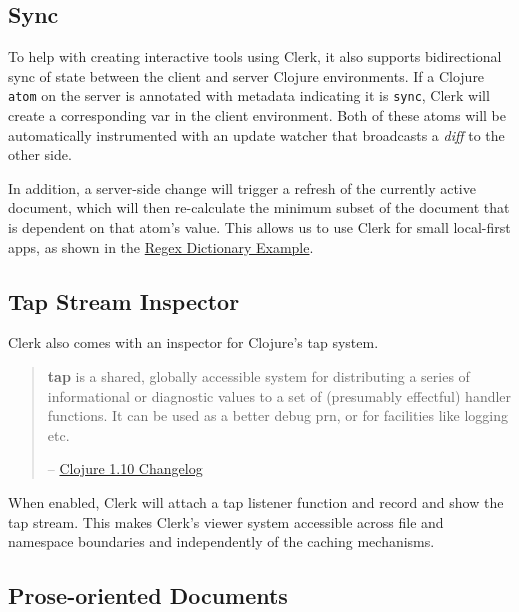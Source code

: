\documentclass[sigconf,screen]{acmart}
\newcommand{\passthrough}[1]{#1}
\begin{document}
\hypertarget{id}{%
\subsection{Sync}\label{id}}

To help with creating interactive tools using Clerk, it also supports bidirectional sync of state between the client and server Clojure environments. If a Clojure \passthrough{\lstinline!atom!} on the server is annotated with metadata indicating it is \passthrough{\lstinline!sync!}, Clerk will create a corresponding var in the client environment. Both of these atoms will be automatically instrumented with an update watcher that broadcasts a \emph{diff} to the other side.

In addition, a server-side change will trigger a refresh of the currently active document, which will then re-calculate the minimum subset of the document that is dependent on that atom's value. This allows us to use Clerk for small local-first apps, as shown in the \protect\hyperlink{regex-dictionary}{Regex Dictionary Example}.

\hypertarget{id}{%
\subsection{Tap Stream Inspector}\label{id}}

Clerk also comes with an inspector for Clojure's tap system.

\begin{quote}
\textbf{tap} is a shared, globally accessible system for distributing a series of informational or diagnostic values to a set of (presumably effectful) handler functions. It can be used as a better debug prn, or for facilities like logging etc.

-- \href{https://github.com/clojure/clojure/blob/0b42eab4bfca5270e0d2b2e58d83b1e2c8a85473/changes.md\#23-tap}{Clojure 1.10 Changelog}
\end{quote}

When enabled, Clerk will attach a tap listener function and record and show the tap stream. This makes Clerk's viewer system accessible across file and namespace boundaries and independently of the caching mechanisms.

\hypertarget{id}{%
\subsection{Prose-oriented Documents}\label{id}}
\end{document}
